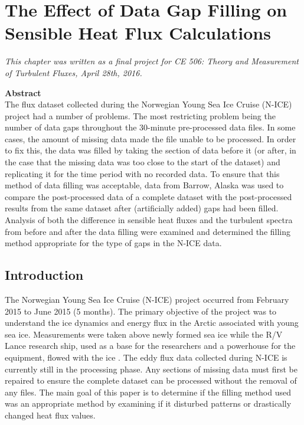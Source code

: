 \chapter{The Effect of Data Gap Filling on Sensible Heat Flux Calculations}
\bigskip
\begin{spacing}{1}
\begin{center}
\textit{This chapter was written as a final project for CE 506: Theory and Measurement of Turbulent Fluxes, April 28th, 2016.}\\
\end{center}
\bigskip
\noindent \textbf{Abstract}\\
\noindent The flux dataset collected during the Norwegian Young Sea Ice Cruise (N-ICE) project had a number of problems. The most restricting problem being the number of data gaps throughout the 30-minute pre-processed data files. In some cases, the amount of missing data made the file unable to be processed. In order to fix this, the data was filled by taking the section of data before it (or after, in the case that the missing data was too close to the start of the dataset) and replicating it for the time period with no recorded data. To ensure that this method of data filling was acceptable, data from Barrow, Alaska was used to compare the post-processed data of a complete dataset with the post-processed results from the same dataset after (artificially added) gaps had been filled. Analysis of both the difference in sensible heat fluxes and the turbulent spectra from before and after the data filling were examined and determined the filling method appropriate for the type of gaps in the N-ICE data. 
\end{spacing}
\doublespacing

\section{Introduction}
The Norwegian Young Sea Ice Cruise (N-ICE) project occurred from February 2015 to June 2015 (5 months). The primary objective of the project was to understand the ice dynamics and energy flux in the Arctic associated with young sea ice. Measurements were taken above newly formed sea ice while the R/V Lance research ship, used as a base for the researchers and a powerhouse for the equipment, flowed with the ice \citep{granskog:2016}. The eddy flux data collected during N-ICE is currently still in the processing phase. Any sections of missing data must first be repaired to ensure the complete dataset can be processed without the removal of any files. The main goal of this paper is to determine if the filling method used was an appropriate method by examining if it disturbed patterns or drastically changed heat flux values.

